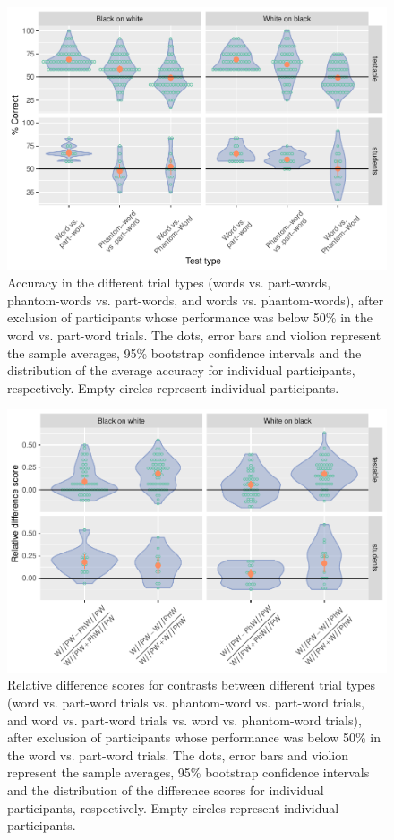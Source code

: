 \documentclass[
]{article}
\begin{document}
\begin{figure}

{\centering \includegraphics[width=0.8\linewidth]{vsl_phamtoms_simultaneous_results_files/figure-latex/vsl-simultaneous-fa-plot-accuracy-1} 

}

\caption{Accuracy in the different trial types (words vs. part-words, phantom-words vs. part-words, and words vs. phantom-words), after exclusion of participants whose performance was below 50\% in the word vs. part-word trials. The dots, error bars and violion represent the sample averages, 95\% bootstrap confidence intervals and the distribution of the average accuracy for individual participants, respectively. Empty circles represent individual participants.}\label{fig:vsl-simultaneous-fa-plot-accuracy}
\end{figure}

\begin{figure}

{\centering \includegraphics[width=0.8\linewidth]{vsl_phamtoms_simultaneous_results_files/figure-latex/vsl-simultaneous-fa-plot-difference-scores-1} 

}

\caption{Relative difference scores for contrasts between different trial types (word vs. part-word trials vs. phantom-word vs. part-word trials, and word vs. part-word trials vs. word vs. phantom-word trials), after exclusion of participants whose performance was below 50\% in the word vs. part-word trials. The dots, error bars and violion represent the sample averages, 95\% bootstrap confidence intervals and the distribution of the difference scores for individual participants, respectively. Empty circles represent individual participants.}\label{fig:vsl-simultaneous-fa-plot-difference-scores}
\end{figure}
\end{document}
